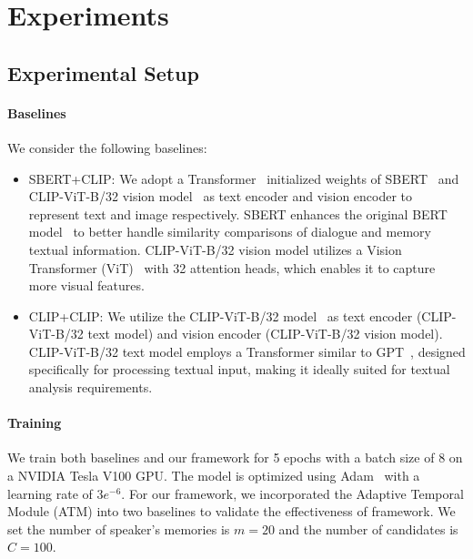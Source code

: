 \section{Experiments}
\subsection{Experimental Setup}
\paragraph{Baselines} We consider the following baselines:

\begin{itemize}
\vspace{-2mm}
    \item SBERT+CLIP: We adopt a Transformer~\cite{vaswani2017attention} initialized weights of SBERT~\cite{reimers2019sentence} and CLIP-ViT-B/32 vision model~\cite{radford2021learning} as text encoder and vision encoder to represent text and image respectively. SBERT enhances the original BERT model~\cite{devlin2018bert} to better handle similarity comparisons of  dialogue and memory textual information. CLIP-ViT-B/32 vision model utilizes a Vision Transformer (ViT)~\cite{dosovitskiy2020image} with 32 attention heads, which enables it to capture more visual features.
    
\vspace{-2mm}
    \item CLIP+CLIP: We utilize the CLIP-ViT-B/32 model~\cite{radford2021learning} as text encoder (CLIP-ViT-B/32 text model) and vision encoder (CLIP-ViT-B/32 vision model). CLIP-ViT-B/32 text model employs a Transformer similar to GPT~\cite{radford2018improving}, designed specifically for processing textual input, making it ideally suited for textual analysis requirements.

\end{itemize}

\paragraph{Training}

We train both baselines and our framework for 5 epochs with a batch size of 8 on a NVIDIA Tesla V100 GPU. The model is optimized using Adam~\cite{kingma2014adam} with a learning rate of $3e^{-6}$. For our framework, we incorporated the Adaptive Temporal Module (ATM) into two baselines to validate the effectiveness of framework. We set the number of speaker's memories is $m=20$ and the number of candidates is $C=100$.

